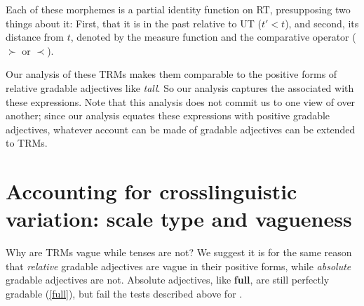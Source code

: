 \documentclass[output=paper,
modfonts
]{langscibook}
\begin{document}
Each of these morphemes is a partial identity function on RT, presupposing two things about it: 
First, that it is in the past relative to UT ($t' < t$), and second, its distance from $t$, denoted by the measure function and the comparative operator ($\succ$ or $\prec$).

Our analysis of these TRMs makes them comparable to the positive forms of relative gradable adjectives like \textit{tall}.
So our analysis captures the  associated with these expressions.
Note that this analysis does not commit us to one view of  over another; since our analysis equates these expressions with positive gradable adjectives, whatever account can be made of gradable adjectives can be extended to TRMs. 





\section{Accounting for crosslinguistic variation: scale type and vagueness}\label{sec:bochnakklecha:6}

Why are  TRMs vague while  tenses are not?
We suggest it is for the same reason that \textit{relative} gradable adjectives are vague in their positive forms, while \textit{absolute} gradable adjectives are not.
Absolute adjectives, like \textbf{full}, are still perfectly gradable (\ref{full}), but fail the tests described above for .

%
%
%
%

%
%
\end{document}
